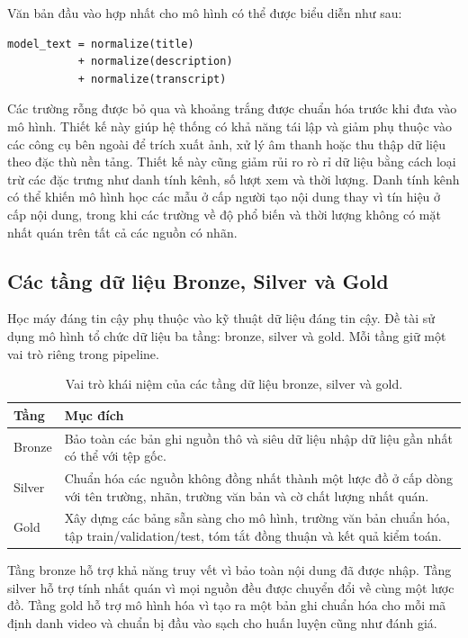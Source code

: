 Văn bản đầu vào hợp nhất cho mô hình có thể được biểu diễn như sau:

\begin{verbatim}
model_text = normalize(title)
           + normalize(description)
           + normalize(transcript)
\end{verbatim}

Các trường rỗng được bỏ qua và khoảng trắng được chuẩn hóa trước khi đưa vào mô hình. Thiết kế này giúp hệ thống có khả năng tái lập và giảm phụ thuộc vào các công cụ bên ngoài để trích xuất ảnh, xử lý âm thanh hoặc thu thập dữ liệu theo đặc thù nền tảng. Thiết kế này cũng giảm rủi ro rò rỉ dữ liệu bằng cách loại trừ các đặc trưng như danh tính kênh, số lượt xem và thời lượng. Danh tính kênh có thể khiến mô hình học các mẫu ở cấp người tạo nội dung thay vì tín hiệu ở cấp nội dung, trong khi các trường về độ phổ biến và thời lượng không có mặt nhất quán trên tất cả các nguồn có nhãn.

\subsection{Các tầng dữ liệu Bronze, Silver và Gold}

Học máy đáng tin cậy phụ thuộc vào kỹ thuật dữ liệu đáng tin cậy. Đề tài sử dụng mô hình tổ chức dữ liệu ba tầng: bronze, silver và gold. Mỗi tầng giữ một vai trò riêng trong pipeline.

\begin{table}[H]
\centering
\renewcommand{\arraystretch}{1.35}
\begin{tabularx}{\textwidth}{|>{\raggedright\arraybackslash}p{2.2cm}|>{\raggedright\arraybackslash}X|}
\hline
\textbf{Tầng} & \textbf{Mục đích} \\
\hline
Bronze & Bảo toàn các bản ghi nguồn thô và siêu dữ liệu nhập dữ liệu gần nhất có thể với tệp gốc. \\
\hline
Silver & Chuẩn hóa các nguồn không đồng nhất thành một lược đồ ở cấp dòng với tên trường, nhãn, trường văn bản và cờ chất lượng nhất quán. \\
\hline
Gold & Xây dựng các bảng sẵn sàng cho mô hình, trường văn bản chuẩn hóa, tập train/validation/test, tóm tắt đồng thuận và kết quả kiểm toán. \\
\hline
\end{tabularx}
\caption{Vai trò khái niệm của các tầng dữ liệu bronze, silver và gold.}
\label{tab:theory-data-layers}
\end{table}

Tầng bronze hỗ trợ khả năng truy vết vì bảo toàn nội dung đã được nhập. Tầng silver hỗ trợ tính nhất quán vì mọi nguồn đều được chuyển đổi về cùng một lược đồ. Tầng gold hỗ trợ mô hình hóa vì tạo ra một bản ghi chuẩn hóa cho mỗi mã định danh video và chuẩn bị đầu vào sạch cho huấn luyện cũng như đánh giá.

